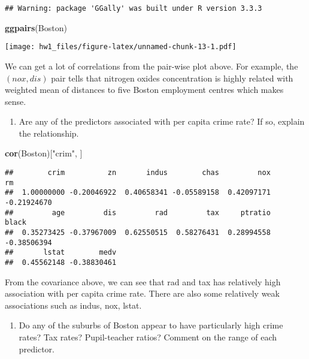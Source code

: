 \documentclass[]{article}
\newenvironment{Shaded}{\begin{snugshade}}{\end{snugshade}}
\newcommand{\KeywordTok}[1]{\textcolor[rgb]{0.13,0.29,0.53}{\textbf{#1}}}
\newcommand{\NormalTok}[1]{#1}
\newcommand{\StringTok}[1]{\textcolor[rgb]{0.31,0.60,0.02}{#1}}
\providecommand{\tightlist}{%
  \setlength{\itemsep}{0pt}\setlength{\parskip}{0pt}}
\begin{document}
\begin{verbatim}
## Warning: package 'GGally' was built under R version 3.3.3
\end{verbatim}

\begin{Shaded}
\begin{Highlighting}[]
\KeywordTok{ggpairs}\NormalTok{(Boston)}
\end{Highlighting}
\end{Shaded}

\texttt{[image: hw1\_files/figure-latex/unnamed-chunk-13-1.pdf]}

We can get a lot of correlations from the pair-wise plot above. For
example, the \((nox,dis)\) pair tells that nitrogen oxides concentration
is highly related with weighted mean of distances to five Boston
employment centres which makes sense.

\begin{enumerate}
\def\labelenumi{(\alph{enumi})}
\setcounter{enumi}{2}
\tightlist
\item
  Are any of the predictors associated with per capita crime rate? If
  so, explain the relationship.
\end{enumerate}

\begin{Shaded}
\begin{Highlighting}[]
\KeywordTok{cor}\NormalTok{(Boston)[}\StringTok{"crim"}\NormalTok{, ]}
\end{Highlighting}
\end{Shaded}

\begin{verbatim}
##        crim          zn       indus        chas         nox          rm 
##  1.00000000 -0.20046922  0.40658341 -0.05589158  0.42097171 -0.21924670 
##         age         dis         rad         tax     ptratio       black 
##  0.35273425 -0.37967009  0.62550515  0.58276431  0.28994558 -0.38506394 
##       lstat        medv 
##  0.45562148 -0.38830461
\end{verbatim}

From the covariance above, we can see that rad and tax has relatively
high association with per capita crime rate. There are also some
relatively weak associations such as indus, nox, lstat.

\begin{enumerate}
\def\labelenumi{(\alph{enumi})}
\setcounter{enumi}{3}
\tightlist
\item
  Do any of the suburbs of Boston appear to have particularly high crime
  rates? Tax rates? Pupil-teacher ratios? Comment on the range of each
  predictor.
\end{enumerate}
\end{document}
